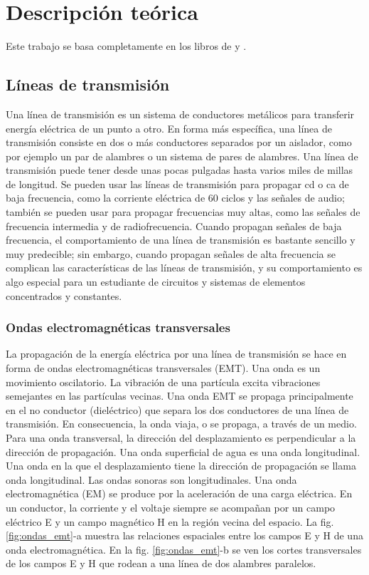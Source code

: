 \section{Descripción teórica} \label{sec:marco_teorico}

    Este trabajo se basa completamente en los libros de \cite{tomasi2003sistemas} y \cite{vela1999lineas}. 
    
    \subsection{Líneas de transmisión}

        Una línea de transmisión es un sistema de conductores metálicos para transferir energía eléctrica de un punto a otro. En forma más específica, una línea de transmisión consiste en dos o más conductores separados por un aislador, como por ejemplo un par de alambres o un sistema de pares de alambres. Una línea de transmisión puede tener desde unas pocas pulgadas hasta varios miles de millas de longitud. Se pueden usar las líneas de transmisión para propagar cd o ca de baja frecuencia, como la corriente eléctrica de 60 ciclos y las señales de audio; también se pueden usar para propagar frecuencias muy altas, como las señales de frecuencia intermedia y de radiofrecuencia. Cuando propagan señales de baja frecuencia, el comportamiento de una línea de transmisión es bastante sencillo y muy predecible; sin embargo, cuando propagan señales de alta frecuencia se complican las características de las líneas de transmisión, y su comportamiento es algo especial para un estudiante de circuitos y sistemas de elementos concentrados y constantes.

        \subsubsection{Ondas electromagnéticas transversales}

            La propagación de la energía eléctrica por una línea de transmisión se hace en forma de ondas electromagnéticas transversales (EMT). Una onda es un movimiento oscilatorio. La vibración de una partícula excita vibraciones semejantes en las partículas vecinas. Una onda EMT se propaga principalmente en el no conductor (dieléctrico) que separa los dos conductores de una línea de transmisión. En consecuencia, la onda viaja, o se propaga, a través de un medio. Para una onda transversal, la dirección del desplazamiento es perpendicular a la dirección de propagación. Una onda superficial de agua es una onda longitudinal. Una onda en la que el desplazamiento tiene la dirección de propagación se llama onda longitudinal. Las ondas sonoras son longitudinales. Una onda electromagnética (EM) se produce por la aceleración de una carga eléctrica. En un conductor, la corriente y el voltaje siempre se acompañan por un campo eléctrico E y un campo magnético H en la región vecina del espacio. La fig. \ref{fig:ondas_emt}-a muestra las relaciones espaciales entre los campos E y H de una onda electromagnética. En la fig. \ref{fig:ondas_emt}-b se ven los cortes transversales de los campos E y H que rodean a una línea de dos alambres paralelos.

